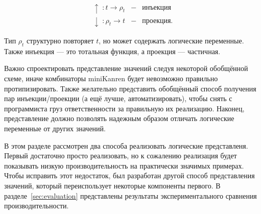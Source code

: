 \[
\begin{array}{rcl}
   \uparrow  \;: t \to \rho_t & - & \mbox{инъекция}\\
   \downarrow\;: \rho_t \to t & - & \mbox{проекция.}
\end{array}
\]

\noindent Тип $\rho_t$ структурно повторяет $t$, но может содержать логические переменные. Также инъекция --- это тотальная функция, а проекция --- частичная.


Важно спроектировать представление значений следуя некоторой обобщённой схеме, иначе комбинаторы miniKanren будет невозможно правильно протипизировать.
Также желательно представить обобщённый способ получения пар инъекции/проекции (а ещё лучше, автоматизировать), чтобы снять с программиста груз ответственности за правильную их реализацию.
Наконец, представление должно позволять надежным образом отличать логические переменные от других значений.


В этом разделе рассмотрен два способа реализовать логические представленя.
Первый достаточно просто реализовать, но к сожалению реализация будет показывать низкую производительность на практически значимых примерах.
Чтобы исправить этот недостаток, был разработан другой способ представления значений, который переиспользует некоторые компоненты первого.
В разделе~\ref{sec:evaluation} представлены результаты экспериментального сравнения производительности.


